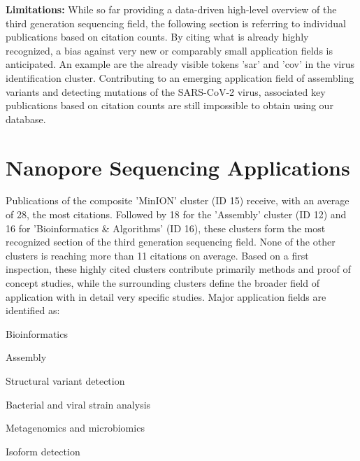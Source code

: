\textbf{Limitations:} 
While so far providing a data-driven high-level overview of the third generation sequencing field, the following section is referring to individual publications based on citation counts.
By citing what is already highly recognized, a bias against very new or comparably small application fields is anticipated.
An example are the already visible tokens 'sar' and 'cov' in the virus identification cluster.
Contributing to an emerging application field of assembling variants and detecting mutations of the SARS-CoV-2 virus, associated key publications based on citation counts are still impossible to obtain using our database.




\section{Nanopore Sequencing Applications}
\label{sec:state_of_art:nanopore}

Publications of the composite 'MinION' cluster (ID 15) receive, with an average of 28, the most citations.
Followed by 18 for the 'Assembly' cluster (ID 12) and 16 for 'Bioinformatics \& Algorithms' (ID 16), these clusters form the most recognized section of the third generation sequencing field.
None of the other clusters is reaching more than 11 citations on average.
Based on a first inspection, these highly cited clusters contribute primarily methods and proof of concept studies, while the surrounding clusters define the broader field of application with in detail very specific studies.
Major application fields are identified as:

\begin{packed_enum}
	\item Bioinformatics
	\item Assembly
	\item Structural variant detection
	\item Bacterial and viral strain analysis
	\item Metagenomics and microbiomics
	\item Isoform detection
\end{packed_enum}

